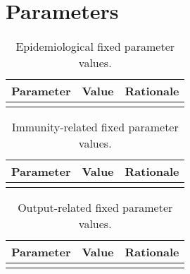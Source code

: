 \documentclass{article}
\begin{document}

\section{Parameters}


\begin{table}
    \begin{tabularx}{\textwidth}{| X | X | X |}
    \hline
    Parameter & Value & Rationale \\
    \hline
     \\
    \hline
    \end{tabularx}
	\caption{Epidemiological fixed parameter values.}
    \label{tab:fixed_params}
\end{table}

\begin{table}
    \begin{tabularx}{\textwidth}{| X | X | X |}
    \hline
    Parameter & Value & Rationale \\
    \hline
     \\
    \hline
    \end{tabularx}
	\caption{Immunity-related fixed parameter values.}
    \label{tab:immunity_params}
\end{table}

\begin{table}
    \begin{tabularx}{\textwidth}{| X | X | X |}
    \hline
    Parameter & Value & Rationale \\
    \hline
     \\
    \hline
    \end{tabularx}
	\caption{Output-related fixed parameter values.}
    \label{tab:output_params}
\end{table}

\newpage    
\printbibliography
\end{document}
